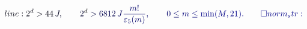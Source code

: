 \documentclass[12pt]{article}
\begin{document}
\makeatletter
\renewcommand*{\@textcolor}[3]{%
  \protect\leavevmode
  \begingroup
    \color#1{#2}#3%
  \endgroup
}
\makeatother
\begin{displaymath}
\mathcolor[RGB]{0,0,15}{line:
2^d>44} \mathcolor[RGB]{0,0,30}{\,J,\qquad} \mathcolor[RGB]{0,0,45}{2} ^d \mathcolor[RGB]{0,0,60}{>} \mathcolor[RGB]{0,0,75}{6812\,} \mathcolor[RGB]{0,0,90}{J} \mathcolor[RGB]{0,0,105}{\frac{m!}{\varepsilon_5(m)},\qquad0\le} \mathcolor[RGB]{0,0,120}{m\le} \mathcolor[RGB]{0,0,135}{\min(M,21).\qedhere

norm_str:}
\end{displaymath}
\end{document}
